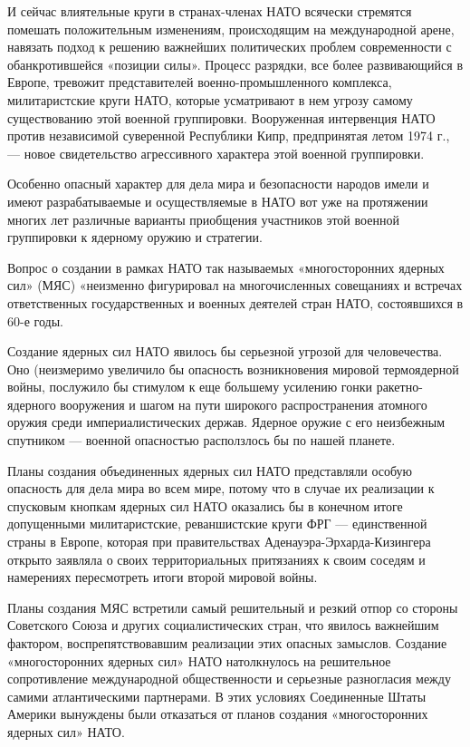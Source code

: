 \documentclass[12pt, a4paper, openany]{book}
\begin{document}
И сейчас влиятельные круги в странах-членах НАТО всячески стремятся помешать положительным изменениям, происходящим на международной арене, навязать подход к решению важнейших политических проблем современности с обанкротившейся «позиции силы». Процесс разрядки, все более развивающийся в Европе, тревожит представителей военно-промышленного комплекса, милитаристские круги НАТО, которые усматривают в нем угрозу самому существованию этой военной группировки. Вооруженная интервенция НАТО против независимой суверенной Республики Кипр, предпринятая летом 1974 г., — новое свидетельство агрессивного характера этой военной группировки.

Особенно опасный характер для дела мира и безопасности народов имели и имеют разрабатываемые и осуществляемые в НАТО вот уже на протяжении многих лет различные варианты приобщения участников этой военной группировки к ядерному оружию и стратегии.

Вопрос о создании в рамках НАТО так называемых «многосторонних ядерных сил» (МЯС) «неизменно фигурировал на многочисленных совещаниях и встречах ответственных государственных и военных деятелей стран НАТО, состоявшихся в 60-е годы.

Создание ядерных сил НАТО явилось бы серьезной угрозой для человечества. Оно (неизмеримо увеличило бы опасность возникновения мировой термоядерной войны, послужило бы стимулом к еще большему усилению гонки ракетно-ядерного вооружения и шагом на пути широкого распространения атомного оружия среди империалистических держав. Ядерное оружие с его неизбежным спутником — военной опасностью расползлось бы по нашей планете.

Планы создания объединенных ядерных сил НАТО представляли особую опасность для дела мира во всем мире, потому что в случае их реализации к спусковым кнопкам ядерных сил НАТО оказались бы в конечном итоге допущенными милитаристские, реваншистские круги ФРГ — единственной страны в Европе, которая при правительствах Аденауэра-Эрхарда-Кизингера открыто заявляла о своих территориальных притязаниях к своим соседям и намерениях пересмотреть итоги второй мировой войны.

Планы создания МЯС встретили самый решительный и резкий отпор со стороны Советского Союза и других социалистических стран, что явилось важнейшим фактором, воспрепятствовавшим реализации этих опасных замыслов. Создание «многосторонних ядерных сил» НАТО натолкнулось на решительное сопротивление международной общественности и серьезные разногласия между самими атлантическими партнерами. В этих условиях Соединенные Штаты Америки вынуждены были отказаться от планов создания «многосторонних ядерных сил» НАТО.
\end{document}
